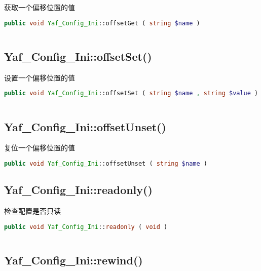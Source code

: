 获取一个偏移位置的值

\begin{lstlisting}[language=PHP]
public void Yaf_Config_Ini::offsetGet ( string $name )
\end{lstlisting}

\begin{lstlisting}[language=PHP]

\end{lstlisting}


\subsection{Yaf\_Config\_Ini::offsetSet()}

设置一个偏移位置的值

\begin{lstlisting}[language=PHP]
public void Yaf_Config_Ini::offsetSet ( string $name , string $value )
\end{lstlisting}

\begin{lstlisting}[language=PHP]

\end{lstlisting}


\subsection{Yaf\_Config\_Ini::offsetUnset()}

复位一个偏移位置的值

\begin{lstlisting}[language=PHP]
public void Yaf_Config_Ini::offsetUnset ( string $name )
\end{lstlisting}


\subsection{Yaf\_Config\_Ini::readonly()}

检查配置是否只读

\begin{lstlisting}[language=PHP]
public void Yaf_Config_Ini::readonly ( void )
\end{lstlisting}

\begin{lstlisting}[language=PHP]

\end{lstlisting}



\subsection{Yaf\_Config\_Ini::rewind()}

